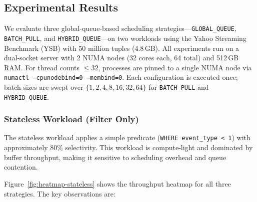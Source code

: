 \subsection{Experimental Results}

We evaluate three global-queue-based scheduling strategies---\texttt{GLOBAL\_QUEUE}, \texttt{BATCH\_PULL}, and \texttt{HYBRID\_QUEUE}---on two workloads using the Yahoo Streaming Benchmark (YSB) with 50 million tuples (4.8\,GB).
All experiments run on a dual-socket server with 2 NUMA nodes (32 cores each, 64 total) and 512\,GB RAM.
For thread counts $\leq 32$, processes are pinned to a single NUMA node via \texttt{numactl --cpunodebind=0 --membind=0}.
Each configuration is executed once; batch sizes are swept over $\{1, 2, 4, 8, 16, 32, 64\}$ for \texttt{BATCH\_PULL} and \texttt{HYBRID\_QUEUE}.

\subsubsection{Stateless Workload (Filter Only)}

The stateless workload applies a simple predicate (\texttt{WHERE event\_type < 1}) with approximately 80\% selectivity.
This workload is compute-light and dominated by buffer throughput, making it sensitive to scheduling overhead and queue contention.

Figure~\ref{fig:heatmap-stateless} shows the throughput heatmap for all three strategies.
The key observations are:

